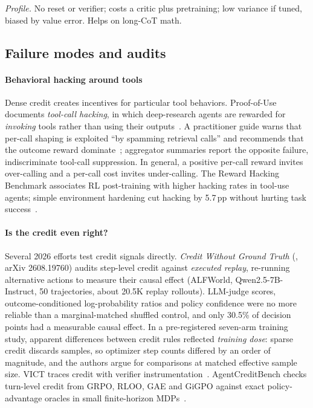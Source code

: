 \emph{Profile.} No reset or verifier; costs a critic plus pretraining; low variance if tuned, biased by value error. Helps on long-CoT math.

\subsection{Failure modes and audits}\label{sec:tax-failures}

\paragraph{Behavioral hacking around tools}
Dense credit creates incentives for particular tool behaviors. Proof-of-Use documents \emph{tool-call hacking}, in which deep-research agents are rewarded for \emph{invoking} tools rather than using their outputs~\citep{proofofuse2025proof}. A practitioner guide warns that per-call shaping is exploited ``by spamming retrieval calls'' and recommends that the outcome reward dominate~\citep{fireworks2025best}; aggregator summaries report the opposite failure, indiscriminate tool-call suppression\unverified. In general, a positive per-call reward invites over-calling and a per-call cost invites under-calling. The Reward Hacking Benchmark associates RL post-training with higher hacking rates in tool-use agents; simple environment hardening cut hacking by 5.7\,pp without hurting task success~\citep{rewardhacking2026benchmark}.

\paragraph{Is the credit even right?}
Several 2026 efforts test credit signals directly. \emph{Credit Without Ground Truth} (\citealp{zhang2026credit}, arXiv 2608.19760) audits step-level credit against \emph{executed replay}, \ie re-running alternative actions to measure their causal effect (ALFWorld, Qwen2.5-7B-Instruct, 50 trajectories, about 20.5K replay rollouts). LLM-judge scores, outcome-conditioned log-probability ratios and policy confidence were no more reliable than a marginal-matched shuffled control, and only 30.5\% of decision points had a measurable causal effect. In a pre-registered seven-arm training study, apparent differences between credit rules reflected \emph{training dose}: sparse credit discards samples, so optimizer step counts differed by an order of magnitude, and the authors argue for comparisons at matched effective sample size\unverified. VICT traces credit with verifier instrumentation~\citep{vict2026verifier}\unverified. AgentCreditBench checks turn-level credit from GRPO, RLOO, GAE and GiGPO against exact policy-advantage oracles in small finite-horizon MDPs~\citep{hectopascal2026agentcreditbench}\unverified.

